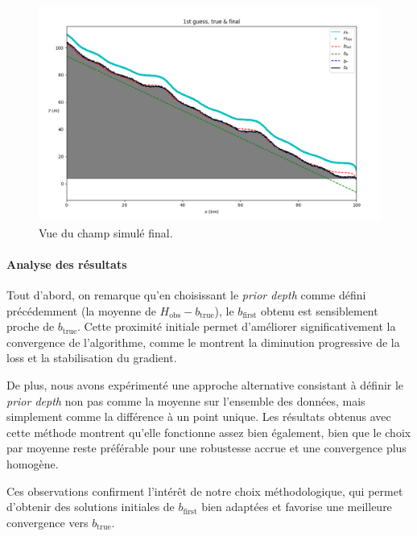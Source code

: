 \documentclass{article}
\begin{document}
\begin{figure}[H]
    \vspace{0.5cm}
    
    \begin{minipage}[b]{0.8\linewidth}
        \centering
        \includegraphics[width=\linewidth]{Images_Ayoub/h_connue/View.png}
        \caption{Vue du champ simulé final.}
        \label{fig:hconnue-view}
    \end{minipage}
\end{figure}




\paragraph{Analyse des résultats}
Tout d'abord, on remarque qu'en choisissant le \emph{prior depth} comme défini précédemment (la moyenne de \(H_{\text{obs}}-b_{\text{true}}\)), le \(b_{\text{first}}\) obtenu est sensiblement proche de \(b_{\text{true}}\). Cette proximité initiale permet d'améliorer significativement la convergence de l'algorithme, comme le montrent la diminution progressive de la loss et la stabilisation du gradient. 

De plus, nous avons expérimenté une approche alternative consistant à définir le \emph{prior depth} non pas comme la moyenne sur l'ensemble des données, mais simplement comme la différence à un point unique. Les résultats obtenus avec cette méthode montrent qu'elle fonctionne assez bien également, bien que le choix par moyenne reste préférable pour une robustesse accrue et une convergence plus homogène.

Ces observations confirment l'intérêt de notre choix méthodologique, qui permet d'obtenir des solutions initiales de \(b_{\text{first}}\) bien adaptées et favorise une meilleure convergence vers \(b_{\text{true}}\).
\end{document}
